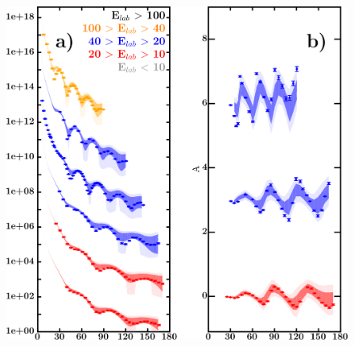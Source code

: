 \documentclass[twocolumn,secnumarabic,amssymb, nobibnotes, aps, prl,
superscriptaddress, nobalancelastpage, draft]{revtex4}
\begin{document}
\begin{figure}[!htb]
    \centering
    \begin{minipage}{0.4\linewidth}
        \centering
        \includegraphics[width=\linewidth]{figures/sn124_protonElastic.png}
        \label{DOM_sn124_proton_elastic}
    \end{minipage}\hspace{6pt}
    \begin{minipage}{0.4\linewidth}
        \vspace{-10pt}
        \begin{minipage}{0.5\linewidth}

\end{minipage}
\end{minipage}
\end{figure}
\end{document}

